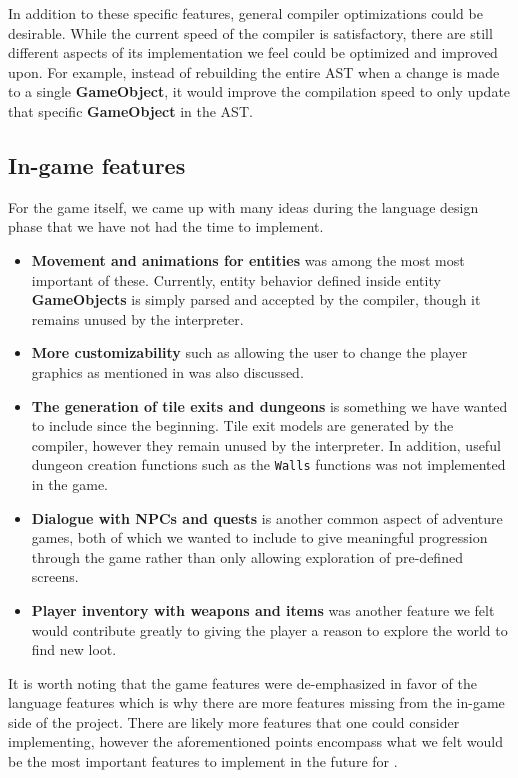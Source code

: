 In addition to these specific features, general compiler optimizations could be desirable.
While the current speed of the compiler is satisfactory, there are still different aspects of its implementation we feel could be optimized and improved upon. 
For example, instead of rebuilding the entire AST when a change is made to a single \textbf{GameObject}, it would improve the compilation speed to only update that specific \textbf{GameObject} in the AST.

\subsection*{In-game features}
For the game itself, we came up with many ideas during the language design phase that we have not had the time to implement. 
\begin{itemize}
  \item
    \textbf{Movement and animations for entities} was among the most most important of these. 
    Currently, entity behavior defined inside entity \textbf{GameObjects} is simply parsed and accepted by the compiler, though it remains unused by the interpreter. 
  \item
      \textbf{More customizability} such as allowing the user to change the player graphics as mentioned in  was also discussed.
  \item 
    \textbf{The generation of tile exits and dungeons} is something we have wanted to include since the beginning. Tile exit models are generated by the compiler, however they remain unused by the interpreter. In addition, useful dungeon creation functions such as the \texttt{Walls} functions was not implemented in the game.
  \item
    \textbf{Dialogue with NPCs and quests} is another common aspect of adventure games, both of which we wanted to include to give meaningful progression through the game rather than only allowing exploration of pre-defined screens. 
  \item 
    \textbf{Player inventory with weapons and items} was another feature we felt would contribute greatly to giving the player a reason to explore the world to find new loot.
\end{itemize}

It is worth noting that the game features were de-emphasized in favor of the language features which is why there are more features missing from the in-game side of the project. There are likely more features that one could consider implementing, however the aforementioned points encompass what we felt would be the most important features to implement in the future for \dazel{}.